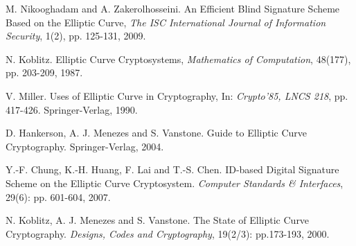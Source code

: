 \documentclass[journal,onecolumn,draftcls]{IEEEtran}
\begin{document}
\begin{thebibliography}{1}
 M. Nikooghadam and A. Zakerolhosseini. An Efficient Blind Signature Scheme Based on the Elliptic Curve, \textit{The ISC International Journal of Information Security}, 1(2), pp. 125-131, 2009.

 N. Koblitz. Elliptic Curve Cryptosystems, \textit{Mathematics of Computation}, 48(177), pp. 203-209, 1987.

 V. Miller. Uses of Elliptic Curve in Cryptography, In: \textit{Crypto'85, LNCS 218}, pp. 417-426. Springer-Verlag, 1990.

 D. Hankerson, A. J. Menezes and S. Vanstone. Guide to Elliptic Curve Cryptography. Springer-Verlag, 2004.

 Y.-F. Chung, K.-H. Huang, F. Lai and T.-S. Chen. ID-based Digital Signature Scheme on the Elliptic Curve Cryptosystem. \textit{Computer Standards \& Interfaces}, 29(6): pp. 601-604, 2007.

 N. Koblitz, A. J. Menezes and S. Vanstone. The State of Elliptic Curve Cryptography. \textit{Designs, Codes and Cryptography}, 19(2/3): pp.173-193, 2000.



\end{thebibliography}
\end{document}
